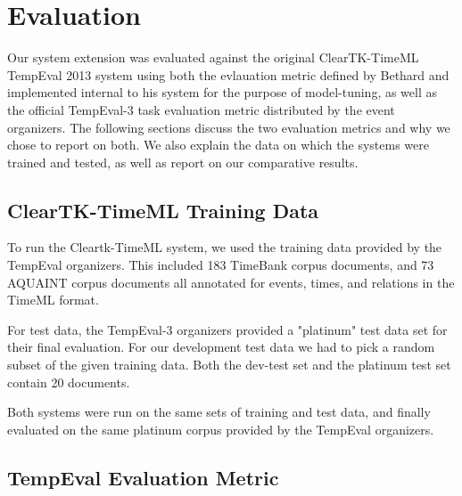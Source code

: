 \documentclass[11pt]{article}
\begin{document}
\section{Evaluation}
Our system extension was evaluated against the original ClearTK-TimeML TempEval 2013 system using both the evlauation metric defined by Bethard and implemented internal to his system for the purpose of model-tuning, as well as the official TempEval-3 task evaluation metric distributed by the event organizers. The following sections discuss the two evaluation metrics and why we chose to report on both. We also explain the data on which the systems were trained and tested, as well as report on our comparative results.
\subsection{ClearTK-TimeML Training Data}

To run the Cleartk-TimeML system, we used the training data provided by the TempEval organizers. This included 183 TimeBank corpus documents, and 73 AQUAINT corpus documents all annotated for events, times, and relations in the TimeML format.

For test data, the TempEval-3 organizers provided a "platinum" test data set for their final evaluation. For our development test data we had to pick a random subset of the given training data. Both the dev-test set and the platinum test set contain 20 documents.

Both systems were run on the same sets of training and test data, and finally evaluated on the same platinum corpus provided by the TempEval organizers. 

\subsection{TempEval Evaluation Metric}
\end{document}
